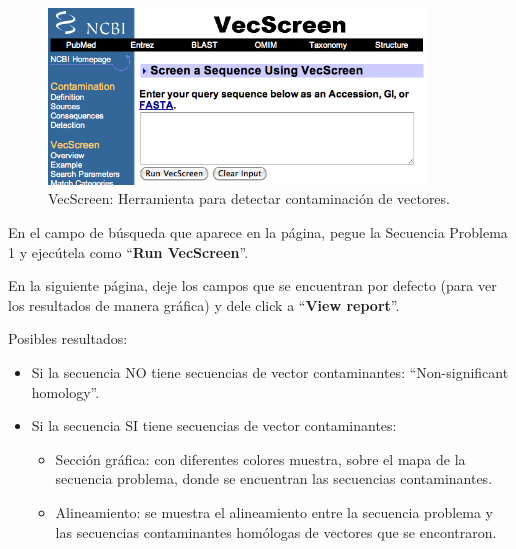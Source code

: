 \documentclass[letter,11pt]{book}
\begin{document}
\begin{figure}[ht]
\centering
   \includegraphics[width=10cm]{Figs/screenshotVecScreen.png}
  \caption{\label{screenshotVecScreen}VecScreen: Herramienta para detectar contaminación de vectores.}
\end{figure}

En el campo de búsqueda que aparece en la página, pegue la Secuencia Problema 1 y ejecútela como ``\textbf{Run VecScreen}''.

En la siguiente página, deje los campos que se encuentran por defecto (para ver los resultados de manera gráfica) y dele click a ``\textbf{View report}''.

Posibles resultados:

\begin{itemize}
\item Si la secuencia NO tiene secuencias de vector contaminantes: ``Non-significant homology''.
\item Si la secuencia SI tiene secuencias de vector contaminantes: 
 \begin{itemize}
 \item Sección gráfica: con diferentes colores muestra, sobre el mapa de la secuencia problema, donde se encuentran las secuencias contaminantes.
  \item Alineamiento: se muestra el alineamiento entre la secuencia problema y las secuencias contaminantes homólogas de vectores que se encontraron.
 \end{itemize}
\end{itemize}
\end{document}
